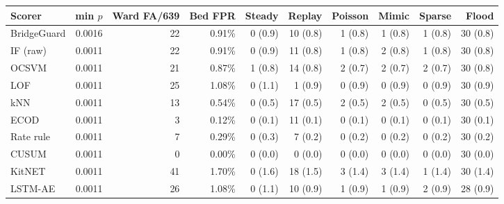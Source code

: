 \begin{tabular}{l r r r rrrrrr}
\toprule
Scorer & min $p$ & Ward FA/639 & Bed FPR & Steady & Replay & Poisson & Mimic & Sparse & Flood \\
\midrule
BridgeGuard & 0.0016 & 22 & 0.91\% & 0 (0.9) & 10 (0.8) & 1 (0.8) & 1 (0.8) & 1 (0.8) & 30 (0.8) \\
IF (raw) & 0.0011 & 22 & 0.91\% & 0 (0.9) & 11 (0.8) & 1 (0.8) & 2 (0.8) & 1 (0.8) & 30 (0.8) \\
OCSVM & 0.0011 & 21 & 0.87\% & 1 (0.8) & 14 (0.8) & 2 (0.7) & 2 (0.7) & 2 (0.7) & 30 (0.8) \\
LOF & 0.0011 & 25 & 1.08\% & 0 (1.1) & 1 (0.9) & 0 (0.9) & 0 (0.9) & 0 (0.9) & 30 (0.9) \\
kNN & 0.0011 & 13 & 0.54\% & 0 (0.5) & 17 (0.5) & 2 (0.5) & 2 (0.5) & 0 (0.5) & 30 (0.5) \\
ECOD & 0.0011 & 3 & 0.12\% & 0 (0.1) & 11 (0.1) & 0 (0.1) & 0 (0.1) & 0 (0.1) & 30 (0.1) \\
Rate rule & 0.0011 & 7 & 0.29\% & 0 (0.3) & 7 (0.2) & 0 (0.2) & 0 (0.2) & 0 (0.2) & 30 (0.2) \\
CUSUM & 0.0011 & 0 & 0.00\% & 0 (0.0) & 0 (0.0) & 0 (0.0) & 0 (0.0) & 0 (0.0) & 30 (0.0) \\
KitNET & 0.0011 & 41 & 1.70\% & 0 (1.6) & 18 (1.5) & 3 (1.4) & 3 (1.4) & 1 (1.4) & 30 (1.4) \\
LSTM-AE & 0.0011 & 26 & 1.08\% & 0 (1.1) & 10 (0.9) & 1 (0.9) & 1 (0.9) & 2 (0.9) & 28 (0.9) \\
\bottomrule
\end{tabular}
